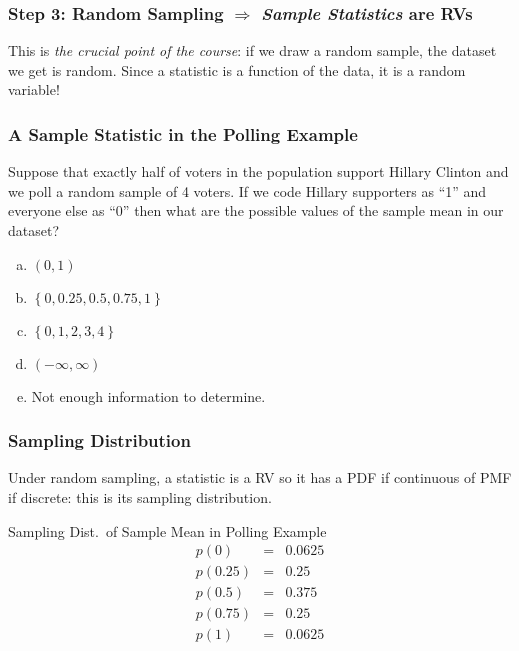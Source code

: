 \documentclass{beamer}
\begin{document}
\begin{frame}
  \frametitle{Step 3: Random Sampling $\Rightarrow$ \emph{Sample Statistics} are RVs} 

  \alert{This is \emph{the crucial point of the course}: if we draw a random sample, the dataset we get is random. Since a statistic is a function of the data, it is a random variable!} 
\end{frame}
\begin{frame}
  \frametitle{A Sample Statistic in the Polling Example}
  Suppose that exactly half of voters in the population support Hillary Clinton and we poll a random sample of 4 voters. If we code Hillary supporters as ``1'' and everyone else as ``0'' then what are the possible values of the sample mean in our dataset?

  \vspace{1em}
  \begin{enumerate}[(a)]
    \item $(0,1)$
    \item $\left\{ 0, 0.25, 0.5, 0.75, 1 \right\}$
    \item $\left\{ 0,1,2,3,4 \right\}$
    \item $(-\infty, \infty)$
    \item Not enough information to determine.
  \end{enumerate}

\end{frame}
\begin{frame}
  \frametitle{Sampling Distribution}
  Under random sampling, a statistic is a RV so it has a PDF if continuous of PMF if discrete: this is its \alert{sampling distribution}. 

  \begin{block}{Sampling Dist.\ of Sample Mean in Polling Example}
   \begin{eqnarray*}
   p(0) &=&  0.0625\\
   p(0.25) &=&  0.25\\ 
   p(0.5) &=&  0.375\\
   p(0.75)&=& 0.25\\ 
   p(1) &=&  0.0625
   \end{eqnarray*}

  \end{block}
\end{frame}
\end{document}
